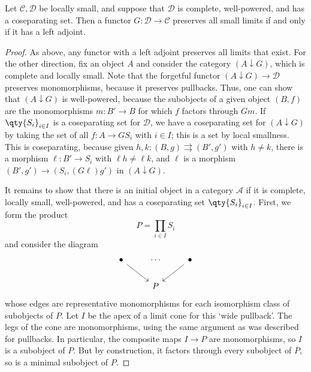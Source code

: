\begin{theorem}
    Let \( \mathcal C, \mathcal D \) be locally small, and suppose that \( \mathcal D \) is complete, well-powered, and has a coseparating set.
    Then a functor \( G : \mathcal D \to \mathcal C \) preserves all small limits if and only if it has a left adjoint.
\end{theorem}
\begin{proof}
    As above, any functor with a left adjoint preserves all limits that exist.
    For the other direction, fix an object \( A \) and consider the category \( (A \downarrow G) \), which is complete and locally small.
    Note that the forgetful functor \( (A \downarrow G) \to \mathcal D \) preserves monomorphisms, because it preserves pullbacks.
    Thus, one can show that \( (A \downarrow G) \) is well-powered, because the subobjects of a given object \( (B, f) \) are the monomorphisms \( m : B' \to B \) for which \( f \) factors through \( Gm \).
    If \( \qty{S_i}_{i \in I} \) is a coseparating set for \( \mathcal D \), we have a coseparating set for \( (A \downarrow G) \) by taking the set of all \( f : A \to GS_i \) with \( i \in I \); this is a set by local smallness.
    This is coseparating, because given \( h, k : (B, g) \rightrightarrows (B', g') \) with \( h \neq k \), there is a morphism \( \ell : B' \to S_i \) with \( \ell h \neq \ell k \), and \( \ell \) is a morphism \( (B', g') \to (S_i, (G\ell)g') \) in \( (A \downarrow G) \).

    It remains to show that there is an initial object in a category \( \mathcal A \) if it is complete, locally small, well-powered, and has a coseparating set \( \qty{S_i}_{i \in I} \).
    First, we form the product
    \[ P = \prod_{i \in I} S_i \]
    and consider the diagram
\[\begin{tikzcd}
	\bullet & \cdots & \bullet \\
	& P
	\arrow[from=1-1, to=2-2]
	\arrow[from=1-3, to=2-2]
\end{tikzcd}\]
    whose edges are representative monomorphisms for each isomorphism class of subobjects of \( P \).
    Let \( I \) be the apex of a limit cone for this `wide pullback'.
    The legs of the cone are monomorphisms, using the same argument as was described for pullbacks.
    In particular, the composite maps \( I \to P \) are monomorphisms, so \( I \) is a subobject of \( P \).
    But by construction, it factors through every subobject of \( P \), so is a minimal subobject of \( P \).


\end{proof}
